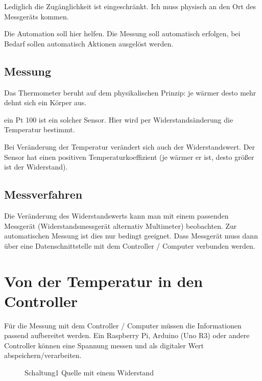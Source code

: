 \documentclass[paper = a4]{scrreprt}
\begin{document}
Lediglich die Zugänglichkeit ist eingeschränkt. Ich muss physisch an den Ort des Messgeräts kommen.

Die Automation soll hier helfen. Die Messung soll automatisch erfolgen, bei Bedarf sollen automatisch Aktionen ausgelöst werden.

\section{Messung}
Das Thermometer beruht auf dem physikalischen Prinzip: je wärmer desto mehr dehnt sich ein Körper aus.

ein Pt 100 ist ein solcher Sensor. Hier wird per Widerstandsänderung die Temperatur bestimmt.

Bei Veränderung der Temperatur verändert sich auch der Widerstandswert. Der Sensor hat einen positiven Temperaturkoeffizient (je wärmer er ist, desto größer ist der Widerstand).


\section{Messverfahren}
Die Veränderung des Widerstandswerts kann man mit einem passenden Messgerät (Widerstandsmessgerät alternativ Multimeter) beobachten. Zur automatischen Messung ist dies nur bedingt geeignet. Dass Messgerät muss dann über eine Datenschnittstelle mit dem Controller / Computer verbunden werden.

\chapter{Von der Temperatur in den Controller}
\label{chapter:SensorAnController}
Für die Messung mit dem Controller / Computer müssen die Informationen passend aufbereitet werden. Ein Raspberry Pi, Arduino (Uno R3) oder andere Controller können eine Spannung messen und als digitaler Wert abspeichern/verarbeiten.

\begin{wrapfigure}{l}{0.5\textwidth}
 \centering
 
 \caption{Schaltung1 Quelle mit einem Widerstand}
 \label{abb:Schaltung1QuelleEinWiderstand}
\end{wrapfigure}
\end{document}
